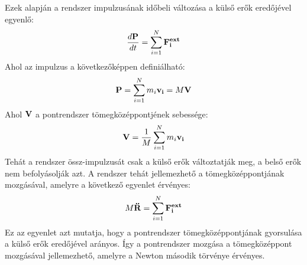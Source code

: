 \documentclass[a4paper,12pt]{article}
\begin{document}
Ezek alapján a rendszer impulzusának időbeli változása a külső erők eredőjével egyenlő:
\begin{equation}
    \frac{d\bold{P}}{dt} = \sum_{i=1}^{N} \bold{F_i^{ext}}
\end{equation}
Ahol az impulzus a következőképpen definiálható:
\begin{equation}
    \bold{P} = \sum_{i=1}^{N} m_i \bold{v_i} = M \bold{V}
\end{equation}
Ahol $\bold{V}$ a pontrendszer tömegközéppontjének sebessége:
\begin{equation}
    \bold{V} = \frac{1}{M} \sum_{i=1}^{N} m_i \bold{v_i}
\end{equation}
Tehát a rendszer össz-impulzusát csak a külső erők változtatják meg, a belső erők nem befolyásolják azt. A rendszer tehát jellemezhető a tömegközéppontjának mozgásával, amelyre a következő egyenlet érvényes:
\begin{equation}
    M \bold{\ddot{R}} = \sum_{i=1}^{N} \bold{F_i^{ext}}
\end{equation}
Ez az egyenlet azt mutatja, hogy a pontrendszer tömegközéppontjának gyorsulása a külső erők eredőjével arányos. Így a pontrendszer mozgása a tömegközéppont mozgásával jellemezhető, amelyre a Newton második törvénye érvényes.
\end{document}
